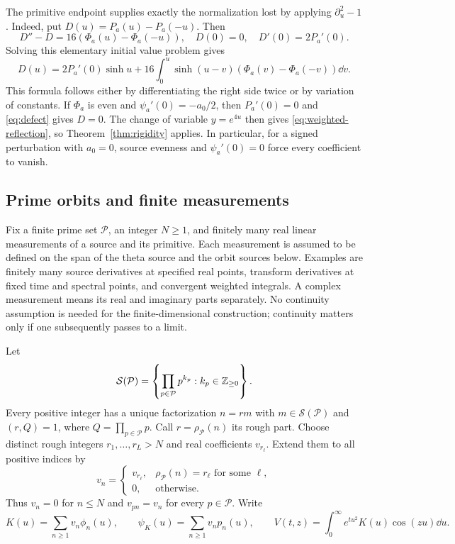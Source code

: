 The primitive endpoint supplies exactly the normalization lost by applying
$\partial_u^2-1$. Indeed, put $D(u)=P_a(u)-P_a(-u)$. Then
\[
 D''-D=16(\Phi_a(u)-\Phi_a(-u)),\quad D(0)=0,\quad D'(0)=2P_a'(0).
\]
Solving this elementary initial value problem gives
\begin{equation}\label{eq:defect}
 D(u)=2P_a'(0)\sinh u+
 16\int_0^u\sinh(u-v)(\Phi_a(v)-\Phi_a(-v))\dd v .
\end{equation}
This formula follows either by differentiating the right side twice or
by variation of constants. If $\Phi_a$ is even and
$\psi_a'(0)=-a_0/2$, then $P_a'(0)=0$ and \eqref{eq:defect} gives $D=0$.
The change of variable $y=e^{4u}$ then gives
\eqref{eq:weighted-reflection}, so Theorem~\ref{thm:rigidity} applies.
In particular, for a signed perturbation with $a_0=0$, source evenness
and $\psi_a'(0)=0$ force every coefficient to vanish.

\subsection{Prime orbits and finite measurements}

Fix a finite prime set $\mathcal P$, an integer $N\ge1$, and finitely many
real linear measurements of a source and its primitive. Each measurement
is assumed to be defined on the span of the theta source and the orbit
sources below. Examples are finitely
many source derivatives at specified real points, transform derivatives
at fixed time and spectral points, and convergent weighted integrals.
A complex measurement means its real and imaginary parts separately.
No continuity assumption is needed for the finite-dimensional construction;
continuity matters only if one subsequently passes to a limit.

Let
\[
 \mathcal S(\mathcal P)=\left\{\prod_{p\in\mathcal P}p^{k_p}:
                              k_p\in\mathbb Z_{\ge0}\right\}.
\]
Every positive integer has a unique factorization $n=rm$ with
$m\in\mathcal S(\mathcal P)$ and $(r,Q)=1$, where $Q=\prod_{p\in\mathcal P}p$.
Call $r=\rho_{\mathcal P}(n)$ its rough part. Choose distinct rough integers
$r_1,\ldots,r_L>N$ and real coefficients $v_{r_\ell}$. Extend them to
all positive indices by
\begin{equation}\label{eq:orbit-coeff}
 v_n=
 \begin{cases}
 v_{r_\ell},&\rho_{\mathcal P}(n)=r_\ell\text{ for some }\ell,\\
 0,&\text{otherwise}.
 \end{cases}
\end{equation}
Thus $v_n=0$ for $n\le N$ and $v_{pn}=v_n$ for every $p\in\mathcal P$.
Write
\begin{equation}\label{eq:orbit-source}
 K(u)=\sum_{n\ge1}v_n\phi_n(u),\qquad
 \psi_K(u)=\sum_{n\ge1}v_np_n(u),\qquad
 V(t,z)=\int_0^\infty e^{tu^2}K(u)\cos(zu)\dd u .
\end{equation}

